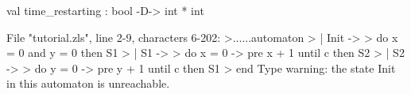 \chklistingtrue
{}
\begin{ChkListingMsg}
val time_restarting : bool -D-> int * int
\end{ChkListingMsg}
\begin{ChkListingErr}
File "tutorial.zls", line 2-9, characters 6-202:
>......automaton
>      | Init ->
>          do x = 0 and y = 0 then S1
>      | S1 ->
>          do x = 0 -> pre x + 1 until c then S2
>      | S2 ->
>          do y = 0 -> pre y + 1 until c then S1
>      end
Type warning: the state Init in this automaton is unreachable.
\end{ChkListingErr}
